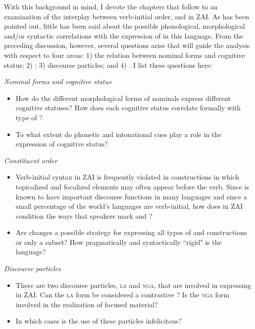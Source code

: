 With this background in mind, I devote the chapters that follow to an examination of the interplay between verb-initial order,  and  in ZAI. As has been pointed out, little has been said about the possible phonological, morphological and/or syntactic correlations with the expression of  in this language. From the preceding discussion, however, several questions arise that will guide the analysis with respect to four areas: 1) the relation between nominal forms and cognitive status; 2) ; 3) discourse particles; and 4) . I list these questions here: 



\noindent \textit{Nominal forms and cognitive status}
\begin{itemize}
\item How do the different morphological forms of nominals express different cognitive statuses? How does each cognitive status correlate formally with type of ?
\item To what extent do phonetic and intonational cues play a role in the expression of cognitive status?
\end{itemize}


\noindent \textit{Constituent order}
\begin{itemize}
\item Verb-initial syntax in ZAI is frequently violated in constructions in which topicalized and focalized elements may often appear before the verb. Since  is known to have important discourse functions in many languages and since a small percentage of the world's languages are verb-initial, how does  in ZAI condition the ways that speakers mark  and ? 
\item Are  changes a possible strategy for expressing all types of  and  constructions or only a subset? How pragmatically and syntactically ``rigid" is the language?
\end{itemize}


\noindent \textit{Discourse particles}
\begin{itemize}
\item There are two discourse particles, \textsc{la} and \textsc{nga}, that are involved in expressing  in ZAI. Can the \textsc{la} form be considered a contrastive ? Is the \textsc{nga} form involved in the realization of focused material? 
\item In which cases is the use of these particles infelicitous?
\end{itemize}


